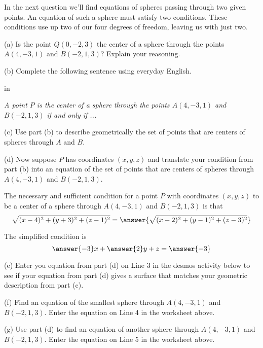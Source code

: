 \documentclass{ximera}
\newcommand{\pskip}{\vskip 0.1 in}
\begin{document}
In the next question we'll find equations of spheres passing through two given points. An equation of such a sphere must satisfy two conditions. These conditions use up two of our four degrees of freedom, leaving us with just two.  

\begin{question}   \label{Q5453466366}
\begin{freeResponse}
(a) Is the point $Q(0,-2,3)$ the center of a sphere through the points $A(4,-3,1)$ and $B(-2,1,3)$? Explain your reasoning.

(b) Complete the following sentence using everyday English.

\pskip

\emph{A point $P$ is the center of a sphere through the points $A(4,-3,1)$ and $B(-2,1,3)$ if and only if ...}

(c) Use part (b) to describe geometrically the set of points that are centers of spheres through $A$ and $B$.

\end{freeResponse}

(d) Now suppose $P$ has coordinates $(x,y,z)$ and translate your condition from part (b) into an equation of the set of points that are centers of spheres through $A(4,-3,1)$ and $B(-2,1,3)$. 

The necessary and sufficient condition for a point $P$ with coordinates $(x,y,z)$ to be a center of a sphere through $A(4,-3,1)$ and $B(-2,1,3)$ is that
\[
     \sqrt{(x-4)^2 + (y+3)^2 + (z-1)^2} = \answer{\sqrt{(x-2)^2 + (y-1)^2 + (z-3)^2}}
\]

The simplified condition is 
\[
       \answer{-3}x + \answer{2}y + z = \answer{-3}
\]

(e) Enter you equation from part (d) on Line 3 in the desmos activity below to see if your equation from part (d) gives a surface that matches your geometric description from part (c).


\begin{onlineOnly}
    \begin{center}
\end{center}
\end{onlineOnly}


(f) Find an equation of the smallest sphere through $A(4,-3,1)$ and $B(-2,1,3)$. Enter the equation on Line 4 in the worksheet above.

(g) Use part (d) to find an equation of another sphere through $A(4,-3,1)$ and $B(-2,1,3)$. Enter the equation on Line 5 in the worksheet above.

\end{question}
\end{document}
